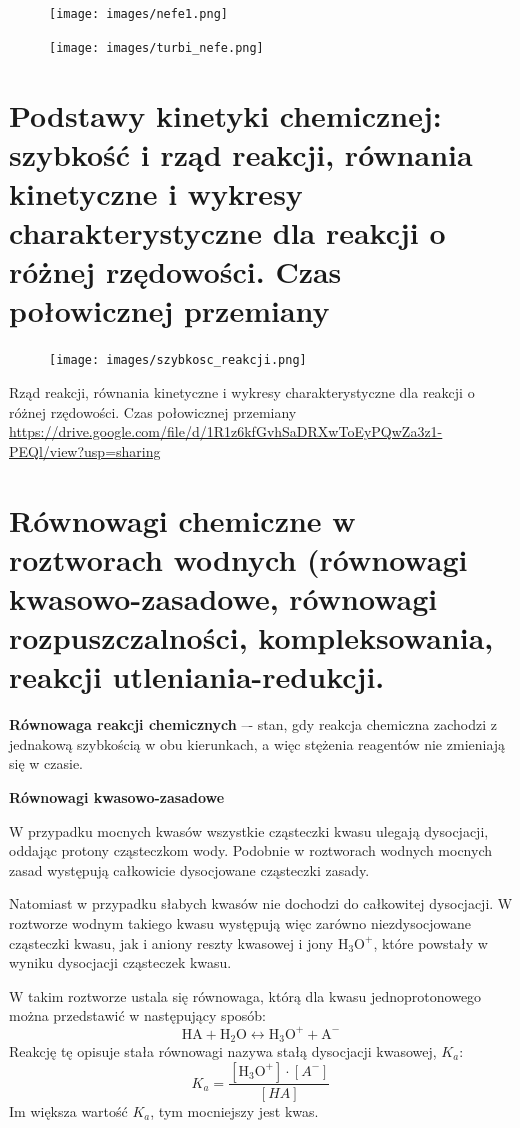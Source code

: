 \documentclass{article}
\begin{document}
\begin{figure}[H]
    \centering
    \texttt{[image: images/nefe1.png]}
\end{figure}

\begin{figure}[H]
    \centering
    \texttt{[image: images/turbi\_nefe.png]}
\end{figure}

\section{Podstawy kinetyki chemicznej: szybkość i rząd reakcji, równania kinetyczne i wykresy charakterystyczne dla reakcji o różnej rzędowości. Czas połowicznej przemiany}

\begin{figure}[H]
    \centering
    \texttt{[image: images/szybkosc\_reakcji.png]}
\end{figure}

Rząd reakcji, równania kinetyczne i wykresy charakterystyczne dla reakcji o różnej rzędowości. Czas połowicznej przemiany \url{https://drive.google.com/file/d/1R1z6kfGvhSaDRXwToEyPQwZa3z1-PEQl/view?usp=sharing}

\section{Równowagi chemiczne w roztworach wodnych (równowagi kwasowo-zasadowe, równowagi rozpuszczalności, kompleksowania, reakcji utleniania-redukcji.}
\textbf{Równowaga reakcji chemicznych} –- stan, gdy reakcja chemiczna zachodzi z jednakową szybkością w obu kierunkach, a więc stężenia reagentów nie zmieniają się w czasie.

\textbf{Równowagi kwasowo-zasadowe}

W przypadku mocnych kwasów wszystkie cząsteczki kwasu ulegają dysocjacji, oddając protony cząsteczkom wody. Podobnie w roztworach wodnych mocnych zasad występują całkowicie dysocjowane cząsteczki zasady.

Natomiast w przypadku słabych kwasów nie dochodzi do całkowitej dysocjacji. W roztworze wodnym takiego kwasu występują więc zarówno niezdysocjowane cząsteczki kwasu, jak i aniony reszty kwasowej i jony $\mathrm{H_3O^+}$, które powstały w wyniku dysocjacji cząsteczek kwasu.

W takim roztworze ustala się równowaga, którą dla kwasu jednoprotonowego można przedstawić w następujący sposób:
\begin{equation*}
    \mathrm{HA}+\mathrm{H_2O} \longleftrightarrow \mathrm{H_3O^+}+\mathrm{A^-}
\end{equation*}
Reakcję tę opisuje stała równowagi nazywa stałą dysocjacji kwasowej, $K_a$:
\begin{equation*}
    K_a=\frac{[\mathrm{H_3O^+}]\cdot [A^-]}{[HA]}
\end{equation*}
Im większa wartość $K_a$, tym mocniejszy jest kwas.
\end{document}
